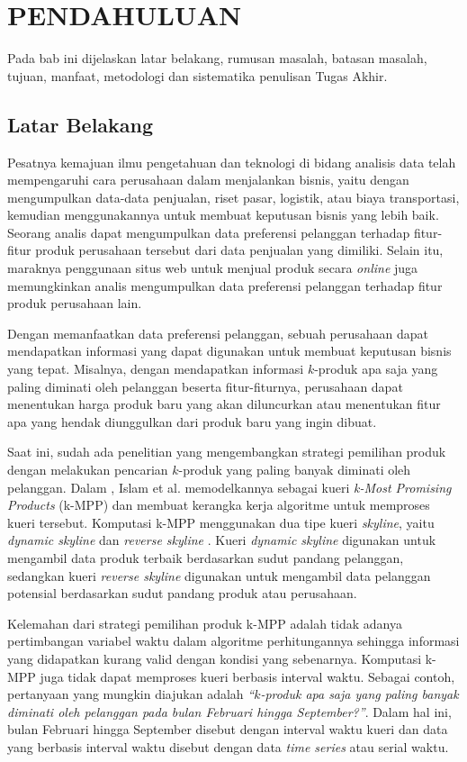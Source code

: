 \chapter{PENDAHULUAN}
\tab Pada bab ini dijelaskan latar belakang, rumusan masalah, batasan masalah, tujuan, manfaat, metodologi dan sistematika penulisan Tugas Akhir.

\section{Latar Belakang}
\tab Pesatnya kemajuan ilmu pengetahuan dan teknologi di bidang analisis data telah mempengaruhi cara perusahaan dalam menjalankan bisnis, yaitu dengan mengumpulkan data-data penjualan, riset pasar, logistik, atau biaya transportasi, kemudian menggunakannya untuk membuat keputusan bisnis yang lebih baik. Seorang analis dapat mengumpulkan data preferensi pelanggan terhadap fitur-fitur produk perusahaan tersebut dari data penjualan yang dimiliki. Selain itu, maraknya penggunaan situs web untuk menjual produk secara \textit{online} juga memungkinkan analis mengumpulkan data preferensi pelanggan terhadap fitur produk perusahaan lain.

Dengan memanfaatkan data preferensi pelanggan, sebuah perusahaan dapat mendapatkan informasi yang dapat digunakan untuk membuat keputusan bisnis yang tepat. Misalnya, dengan mendapatkan informasi $k$-produk apa saja yang paling diminati oleh pelanggan beserta fitur-fiturnya, perusahaan dapat menentukan harga produk baru yang akan diluncurkan atau menentukan fitur apa yang hendak diunggulkan dari produk baru yang ingin dibuat. 

\pagebreak
Saat ini, sudah ada penelitian yang mengembangkan strategi pemilihan produk dengan melakukan pencarian $k$-produk yang paling banyak diminati oleh pelanggan. Dalam \cite{kmpp}, Islam et al. memodelkannya sebagai kueri \textit{k-Most Promising Products} (k-MPP) dan membuat kerangka kerja algoritme untuk memproses kueri tersebut. Komputasi k-MPP menggunakan dua tipe kueri \textit{skyline}, yaitu \textit{dynamic skyline} \cite{dynamic-skyline} dan \textit{reverse skyline} \cite{reverse-skyline}. Kueri \textit{dynamic skyline} digunakan untuk mengambil data produk terbaik berdasarkan sudut pandang pelanggan, sedangkan kueri \textit{reverse skyline} digunakan untuk mengambil data pelanggan potensial berdasarkan sudut pandang produk atau perusahaan.

Kelemahan dari strategi pemilihan produk k-MPP adalah tidak adanya pertimbangan variabel waktu dalam algoritme perhitungannya sehingga informasi yang didapatkan kurang valid dengan kondisi yang sebenarnya. Komputasi k-MPP juga tidak dapat memproses kueri berbasis interval waktu. Sebagai contoh, pertanyaan yang mungkin diajukan adalah \textit{“$k$-produk apa saja yang paling banyak diminati oleh pelanggan pada bulan Februari hingga September?”}. Dalam hal ini, bulan Februari hingga September disebut dengan interval waktu kueri dan data yang berbasis interval waktu disebut dengan data \textit{time series} atau serial waktu.

